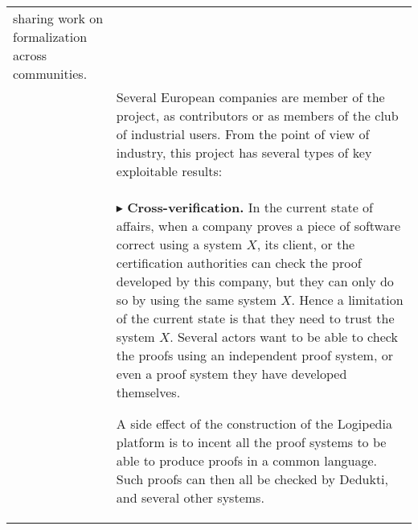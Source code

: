 \begin{longtable}{|p{}|p{}|}
sharing work on formalization across communities.\\
&
\hspace{0.4cm}
Several European companies are member of the project,
as contributors or as members of the club of
industrial users.  From the point of view of industry, this
project has several types of key exploitable results:\\
&
$\blacktriangleright$
{\bf Cross-verification.}
In the current state of affairs, when a company proves a piece of
software correct using a system $X$, its client, or the certification
authorities can check the proof developed by this company, but they
can only do so by using the same system $X$. Hence a limitation of
the current state is that they need to trust the system $X$.
Several actors want to be able to check the proofs using an
independent proof system, or even a proof system they have developed
themselves.

A side effect of the construction of the Logipedia platform is
to incent all the proof systems to be able to produce proofs in a
common language. Such proofs can then all be checked by
Dedukti, and several other systems.


\end{longtable}
